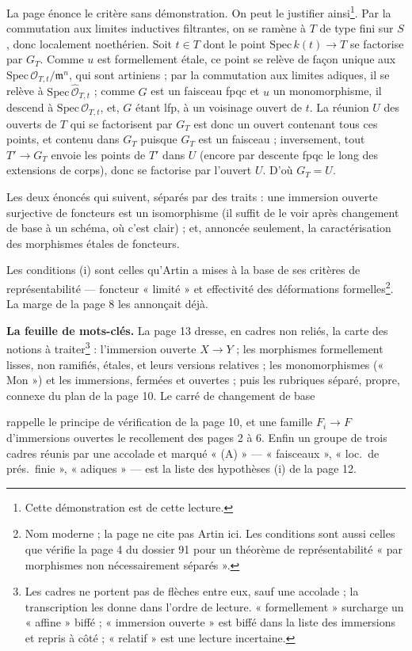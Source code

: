 \documentclass[11pt,a4paper]{article}
\begin{document}
La page énonce le critère sans démonstration. On peut le justifier
ainsi\footnote{Cette démonstration est de cette lecture.}. Par la commutation aux
limites inductives filtrantes, on se ramène à $T$ de type fini sur $S$, donc
localement noethérien. Soit $t \in T$ dont le point $\mathrm{Spec}\,k(t) \to T$
se factorise par $G_T$. Comme $u$ est formellement étale, ce point se relève de
façon unique aux $\mathrm{Spec}\,\mathcal{O}_{T,t}/\mathfrak{m}^n$, qui sont
artiniens ; par la commutation aux limites adiques, il se relève à
$\mathrm{Spec}\,\widehat{\mathcal{O}}_{T,t}$ ; comme $G$ est un faisceau fpqc et
$u$ un monomorphisme, il descend à $\mathrm{Spec}\,\mathcal{O}_{T,t}$, et, $G$
étant lfp, à un voisinage ouvert de $t$. La réunion $U$ des ouverts de $T$ qui se
factorisent par $G_T$ est donc un ouvert contenant tous ces points, et contenu
dans $G_T$ puisque $G_T$ est un faisceau ; inversement, tout $T' \to G_T$ envoie
les points de $T'$ dans $U$ (encore par descente fpqc le long des extensions
de corps), donc se factorise par l'ouvert $U$. D'où $G_T = U$.

Les deux énoncés qui suivent, séparés par des traits : une immersion ouverte
surjective de foncteurs est un isomorphisme (il suffit de le voir après
changement de base à un schéma, où c'est clair) ; et, annoncée seulement, la
caractérisation des morphismes étales de foncteurs.

Les conditions (i) sont celles qu'Artin a mises à la base de ses critères de
représentabilité — foncteur « limité » et effectivité des déformations
formelles\footnote{Nom moderne ; la page ne cite pas Artin ici. Les conditions
sont aussi celles que vérifie la page 4 du dossier 91 pour un théorème de
représentabilité « par morphismes non nécessairement séparés ».}. La marge de
la page 8 les annonçait déjà.

\textbf{La feuille de mots-clés.} La page 13 dresse, en cadres non reliés, la
carte des notions à traiter\footnote{Les cadres ne portent pas de flèches entre
eux, sauf une accolade ; la transcription les donne dans l'ordre de lecture.
« formellement » surcharge un « affine » biffé ; « immersion ouverte » est
biffé dans la liste des immersions et repris à côté ; « relatif » est une
lecture incertaine.} : l'immersion ouverte $X \to Y$ ; les morphismes
formellement lisses, non ramifiés, étales, et leurs versions relatives ; les
monomorphismes (« Mon ») et les immersions, fermées et ouvertes ; puis les
rubriques séparé, propre, connexe du plan de la page 10. Le carré de changement
de base


rappelle le principe de vérification de la page 10, et une famille
$F_i \to F$ d'immersions ouvertes le recollement des pages 2 à 6. Enfin un
groupe de trois cadres réunis par une accolade et marqué « (A) » —
« faisceaux », « loc.\ de prés.\ finie », « adiques » — est la liste des
hypothèses (i) de la page 12.
\end{document}
